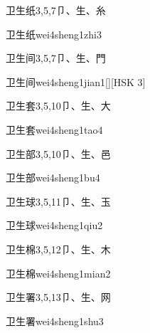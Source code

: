 \begin{Entry}{卫生纸}{3,5,7}{⼙、⽣、⽷}
  \begin{Phonetics}{卫生纸}{wei4sheng1zhi3}
  \end{Phonetics}
\end{Entry}

\begin{Entry}{卫生间}{3,5,7}{⼙、⽣、⾨}
  \begin{Phonetics}{卫生间}{wei4sheng1jian1}[][HSK 3]
  \end{Phonetics}
\end{Entry}

\begin{Entry}{卫生套}{3,5,10}{⼙、⽣、⼤}
  \begin{Phonetics}{卫生套}{wei4sheng1tao4}
  \end{Phonetics}
\end{Entry}

\begin{Entry}{卫生部}{3,5,10}{⼙、⽣、⾢}
  \begin{Phonetics}{卫生部}{wei4sheng1bu4}
  \end{Phonetics}
\end{Entry}

\begin{Entry}{卫生球}{3,5,11}{⼙、⽣、⽟}
  \begin{Phonetics}{卫生球}{wei4sheng1qiu2}
  \end{Phonetics}
\end{Entry}

\begin{Entry}{卫生棉}{3,5,12}{⼙、⽣、⽊}
  \begin{Phonetics}{卫生棉}{wei4sheng1mian2}
  \end{Phonetics}
\end{Entry}

\begin{Entry}{卫生署}{3,5,13}{⼙、⽣、⽹}
  \begin{Phonetics}{卫生署}{wei4sheng1shu3}
  \end{Phonetics}
\end{Entry}

